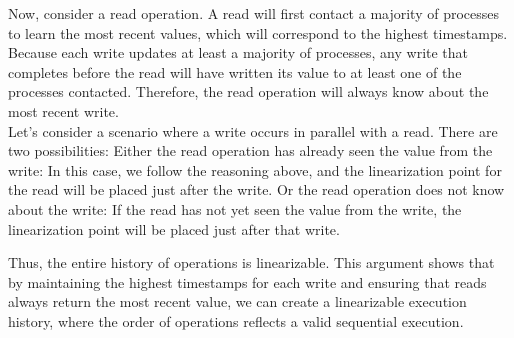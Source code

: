\documentclass{article}
\begin{document}
\vspace{10pt}Now, consider a read operation. A read will first contact a majority of processes to learn the most recent values, which will correspond to the highest timestamps. Because each write updates at least a majority of processes, any write that completes before the read will have written its value to at least one of the processes contacted. Therefore, the read operation will always know about the most recent write. \\Let's consider a scenario where a write occurs in parallel with a read. There are two possibilities:
Either the read operation has already seen the value from the write: In this case, we follow the reasoning above, and the linearization point for the read will be placed just after the write.
Or the read operation does not know about the write: If the read has not yet seen the value from the write, the linearization point will be placed just after that write.

\vspace{10pt}Thus, the entire history of operations is linearizable. This argument shows that by maintaining the highest timestamps for each write and ensuring that reads always return the most recent value, we can create a linearizable execution history, where the order of operations reflects a valid sequential execution.
\end{document}
